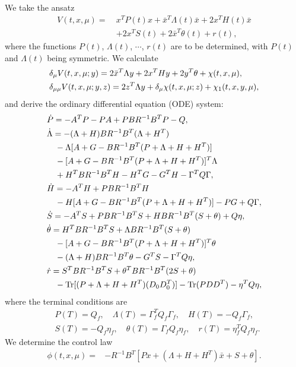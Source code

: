 \documentclass{amsart}
\theoremstyle{definition}
\theoremstyle{remark}
\numberwithin{equation}{section}
\begin{document}
We take the ansatz
\begin{align}
V(t,x,\mu) =\ & x^{T} P(t) x
+\bar x^T \Lambda(t) \bar x + 2 x^{T} H(t) \bar x  \label{Vqsol}   \\
& +2 x^T S(t) +2\bar x^{T} \theta(t)+r(t), \nonumber
\end{align}
where the functions  $P(t)$, $\Lambda(t)$, $\cdots$, $r(t)$  are to be determined, with $P(t)$ and $\Lambda (t)$ being symmetric.
We calculate
\begin{align}
& \delta_{\mu}V(t,x,\mu;y)= 2\bar x^T\Lambda y+2x^THy+2y^{T}\theta+\chi(t,x,\mu) ,  \notag \\
& \delta_{\mu\mu} V(t,x, \mu;y,z)=2z^{T}\Lambda y+\delta_\mu \chi(t,x,\mu;z)  +\chi_1(t,x,y,\mu),  \notag
\end{align}
and derive the ordinary differential equation  (ODE) system:
\begin{align}
& \dot P = -A^T P -PA +PBR^{-1} B^T P -Q, \label{odeP}  \\
& \dot \Lambda  = -(\Lambda +H) BR^{-1}B^T (\Lambda+H^{T}) \label{odeLam} \\
 &\quad -\Lambda [A+G-BR^{-1} B^T(P+\Lambda+ H+H^T)]\notag \\
 & \quad -[A+G-BR^{-1} B^T(P+\Lambda +H+H^T)]^T \Lambda\notag \\
 & \quad +H^TBR^{-1} B^T H- H^TG - G^TH  -\Gamma^T Q\Gamma ,\notag \\
& \dot H  = -A^T H +P BR^{-1} B^T H  \label{odeH}  \\
& \quad -H [A+G-BR^{-1} B^T(P+\Lambda +H+H^T)]-PG +Q\Gamma  ,\notag \\
& \dot S = -A^T S+ PBR^{-1} B^TS+H BR^{-1} B^T(S+\theta) +Q\eta,\label{odeS} \\
& \dot \theta = H^T BR^{-1} B^TS +\Lambda    BR^{-1} B^T(S+\theta) \label{odetheta} \\
& \quad -[A+G-BR^{-1} B^T(P+\Lambda+ H+H^T)]^T\theta\notag \\
& \quad  -(\Lambda+H ) BR^{-1} B^T\theta-G^TS -\Gamma^T Q \eta ,\notag \\
& \dot r = S^T BR^{-1} B^T S
+ \theta^T BR^{-1}B^T (2S+\theta) \label{oder} \\
&\quad -{\rm Tr}[(P+\Lambda+H+H^T)(D_0D_0^T)]-{\rm Tr} (PDD^T)   -\eta^T Q\eta,\notag
 \end{align}
where the terminal conditions are
\begin{align*}
&P(T)= Q_f, \quad \Lambda(T)= \Gamma_f^T  Q_f\Gamma_f , \quad  H(T)=-Q_f \Gamma_f,\\
& S(T)=-Q_f\eta_f,   \quad   \theta(T)=\Gamma_f Q_f\eta_f ,\quad    r(T)= \eta_f^T Q_f \eta_f.
\end{align*}
 We determine the  control law
 \begin{align}
 \phi(t,x,\mu) =&
 -R^{-1} B^T[Px +(\Lambda+H+H^T )
 \bar x +S+\theta ].  \label{meui}
 \end{align}
\end{document}
